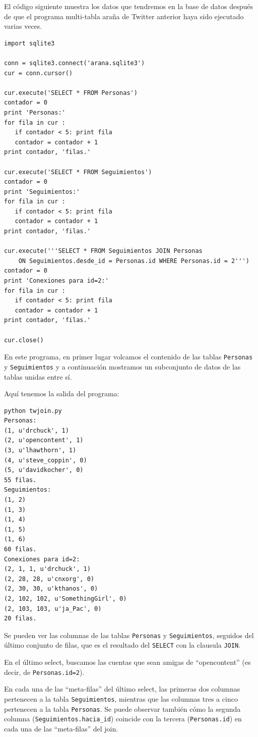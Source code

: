 El código siguiente muestra los datos que tendremos en la
base de datos después de que el programa multi-tabla araña de Twitter anterior
haya sido ejecutado varias veces.

\beforeverb
\begin{verbatim}
import sqlite3

conn = sqlite3.connect('arana.sqlite3')
cur = conn.cursor()

cur.execute('SELECT * FROM Personas')
contador = 0
print 'Personas:'
for fila in cur :
   if contador < 5: print fila
   contador = contador + 1
print contador, 'filas.'

cur.execute('SELECT * FROM Seguimientos')
contador = 0
print 'Seguimientos:'
for fila in cur :
   if contador < 5: print fila
   contador = contador + 1
print contador, 'filas.'

cur.execute('''SELECT * FROM Seguimientos JOIN Personas 
    ON Seguimientos.desde_id = Personas.id WHERE Personas.id = 2''')
contador = 0
print 'Conexiones para id=2:'
for fila in cur :
   if contador < 5: print fila
   contador = contador + 1
print contador, 'filas.'

cur.close()
\end{verbatim}
\afterverb
%
En este programa, en primer lugar volcamos el contenido de las tablas {\tt Personas}
y {\tt Seguimientos} y a continuación mostramos un subconjunto de
datos de las tablas unidas entre sí.

Aquí tenemos la salida del programa:

\beforeverb
\begin{verbatim}
python twjoin.py 
Personas:
(1, u'drchuck', 1)
(2, u'opencontent', 1)
(3, u'lhawthorn', 1)
(4, u'steve_coppin', 0)
(5, u'davidkocher', 0)
55 filas.
Seguimientos:
(1, 2)
(1, 3)
(1, 4)
(1, 5)
(1, 6)
60 filas.
Conexiones para id=2:
(2, 1, 1, u'drchuck', 1)
(2, 28, 28, u'cnxorg', 0)
(2, 30, 30, u'kthanos', 0)
(2, 102, 102, u'SomethingGirl', 0)
(2, 103, 103, u'ja_Pac', 0)
20 filas.
\end{verbatim}
\afterverb
%
Se pueden ver las columnas de las tablas {\tt Personas} y {\tt Seguimientos}, seguidos del último
conjunto de filas, que es el resultado del {\tt SELECT} con la clausula {\tt JOIN}.

En el último select, buscamos las cuentas que sean amigas de
``opencontent'' (es decir, de {\tt Personas.id=2}).

En cada una de las ``meta-filas'' del último select, las primeras dos columnas pertenecen
a la tabla {\tt Seguimientos}, mientras que las columnas tres a cinco pertenecen a la tabla
{\tt Personas}. Se puede observar también cómo la segunda columna (\verb"Seguimientos.hacia_id")
coincide con la tercera ({\tt Personas.id}) en cada una de las ``meta-filas'' del join.

